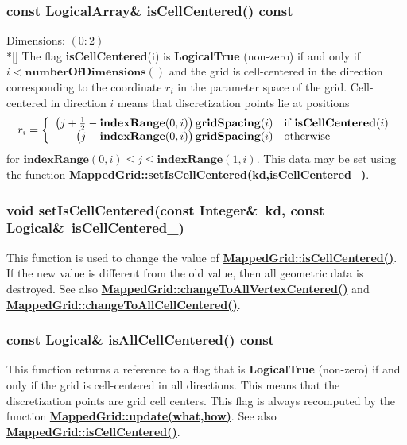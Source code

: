 \documentclass{article}
\begin{document}
  \subsubsection{const LogicalArray\& isCellCentered() const}
  \label{MappedGrid::isCellCentered()}
    Dimensions: $(0\colon2)$ \\*[\parskip]
    The flag \textbf{isCellCentered}(i) is \textbf{LogicalTrue} (non-zero) if and only if
    $i<\textbf{numberOfDimensions}()$ and the grid is cell-centered in the direction corresponding
    to the coordinate $r_i$ in the parameter space of the grid.
    Cell-centered in direction $i$ means that discretization points lie at positions
    \[ r_i = \left\{ \begin{array}{rl}
      \big(j + {1\over2} - \textbf{indexRange}(0,i)\big)\,\textbf{gridSpacing}(i) & \mbox{if \bf{}isCellCentered}(i) \\
      \big(j             - \textbf{indexRange}(0,i)\big)\,\textbf{gridSpacing}(i) & \mbox{otherwise}                   \\
    \end{array} \right. \]
    for $\textbf{indexRange}(0,i) \le j \le \textbf{indexRange}(1,i)$.
    This data may be set using the function
    {\bf{}\hyperref{setIsCellCentered(kd,isCellCentered\_)}{setIsCellCentered(kd,isCellCentered\_) \rm(\S}{)}{MappedGrid::setIsCellCentered(kd,isCellCentered_)}}.

  \subsubsection{void setIsCellCentered(const Integer\&~kd, const Logical\&~isCellCentered\_)}
  \label{MappedGrid::setIsCellCentered(kd,isCellCentered_)}
    This function is used to change the value of
    {\bf{}\hyperref{isCellCentered()}{isCellCentered() \rm(\S}{)}{MappedGrid::isCellCentered()}}.
    If the new value is different from the old value, then all geometric data is destroyed.
    See also
    {\bf{}\hyperref{changeToAllVertexCentered()}{changeToAllVertexCentered() \rm(\S}{)}{MappedGrid::changeToAllVertexCentered()}} and
    {\bf{}\hyperref{changeToAllCellCentered()}{changeToAllCellCentered() \rm(\S}{)}{MappedGrid::changeToAllCellCentered()}}.

  \subsubsection{const Logical\& isAllCellCentered() const}
  \label{MappedGrid::isAllCellCentered() const}
    This function returns a reference to a flag that is \textbf{LogicalTrue} (non-zero) if and only if
    the grid is cell-centered in all directions.
    This means that the discretization points are grid cell centers.
    This flag is always recomputed by the function
    {\bf{}\hyperref{update(what,how)}{update(what,how) \rm(\S}{)}{MappedGrid::update(what,how)}}.
    See also {\bf{}\hyperref{isCellCentered()}{isCellCentered() \rm(\S}{)}{MappedGrid::isCellCentered()}}.
\end{document}
